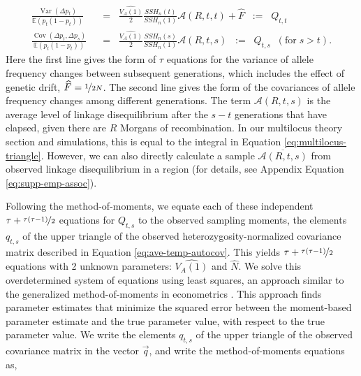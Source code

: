 \documentclass[11pt]{article}
\newcommand{\E}{\mathbb{E}}
\DeclareMathOperator{\var}{Var}
\DeclareMathOperator{\cov}{Cov}
\newcommand{\nssh}{SSH_n}
\begin{document}
\begin{align}
  \frac{\var(\Delta p_t)}{\E(p_t ( 1- p_t))} \; \; &= \; \;
                                                     \frac{\widehat{V_A(1)}}{2}
                                                     \frac{\nssh(t)}{
                                                     \nssh(1)}
                                                     \mathcal{A}(R, t,t)
                                                     + \widehat{F} \;\; :=  \;\; Q_{t,t}  \label{eq:mom-moments-var} \\
  \frac{\cov(\Delta p_t, \Delta p_s)}{\E(p_{t} (1-p_{t}))} \;\; &= \;\; \frac{\widehat{V_A(1)}}{2}\frac{\nssh(s)}{ \nssh(1)} \mathcal{A}(R, t,s) \;\; := \;\; Q_{t,s} \; \; (\text{for} \; s > t ).
 \label{eq:mom-moments-cov}
\end{align}
%
Here the first line gives the form of $\tau$ equations for the variance of
allele  frequency changes between subsequent generations, which includes the
effect of genetic drift, $\widehat{F} =\nicefrac{1}{2N}$. The second line gives
the form of the covariances of allele frequency changes among different
generations. The term $\mathcal{A}(R, t,s)$ is the average level of linkage
disequilibrium after the $s-t$ generations that have elapsed, given there are
$R$ Morgans of recombination. In our multilocus theory section and simulations,
this is equal to the integral in Equation \eqref{eq:multilocus-triangle}.
However, we can also directly calculate a sample $\overline{\mathcal{A}(R,
t,s)}$ from observed linkage disequilibrium in a region (for details, see
Appendix Equation \eqref{eq:supp-emp-assoc}).

Following the method-of-moments, we equate each of these independent $\tau +
\nicefrac{\tau(\tau-1)}{2}$ equations for $Q_{t,s}$ to the observed sampling
moments, the elements $q_{t,s}$ of the upper triangle of the observed
heterozygosity-normalized covariance matrix described in Equation
\eqref{eq:ave-temp-autocov}. This yields $\tau + \nicefrac{\tau (\tau -
1)}{2}$ equations with 2 unknown parameters: $\widehat{V_A(1)}$ and
$\widehat{N}$. We solve this overdetermined system of equations using least
squares, an approach similar to the generalized method-of-moments in
econometrics \parencite{Hansen1982-ck}. This approach finds parameter estimates
that minimize the squared error between the moment-based parameter estimate and
the true parameter value, with respect to the true parameter value. We write
the elements $q_{t,s}$ of the upper triangle of the observed covariance matrix
in the vector $\vec{q}$, and write the method-of-moments equations as,
\end{document}
